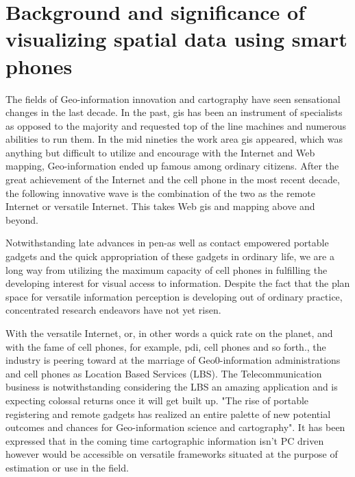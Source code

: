 \section{Background and significance of visualizing spatial data using smart phones}

The fields of Geo-information innovation and cartography have seen sensational changes in the last decade. In the past, \gls{gis} has been an instrument of specialists as opposed to the majority and requested top of the line machines and numerous abilities to run them. In the mid nineties the work area \gls{gis} appeared, which was anything but difficult to utilize and encourage with the Internet and Web mapping, Geo-information ended up famous among ordinary citizens. After the great achievement of the Internet and the cell phone in the most recent decade, the following innovative wave is the combination of the two as the remote Internet or versatile Internet. This takes Web \gls{gis} and mapping above and beyond. 

Notwithstanding late advances in pen-as well as contact empowered portable gadgets and the quick appropriation of these gadgets in ordinary life, we are a long way from utilizing the maximum capacity of cell phones in fulfilling the developing interest for visual access to information. Despite the fact that the plan space for versatile  information perception is developing out of ordinary practice, concentrated research endeavors have not yet risen.

With the versatile Internet, or, in other words a quick rate on the planet, and with the fame of cell phones, for example, \gls{pdi}, cell phones and so forth., the industry is peering toward at the marriage of Geo0-information administrations and cell phones as Location Based Services (LBS). The Telecommunication business is notwithstanding considering the LBS an amazing application and is expecting colossal returns once it will get built up. "The rise of portable registering and remote gadgets has realized an entire palette of new potential outcomes and chances for Geo-information science and cartography". It has been expressed that in the coming time cartographic information isn't PC driven however would be accessible on versatile frameworks situated at the purpose of estimation or use in the field.

